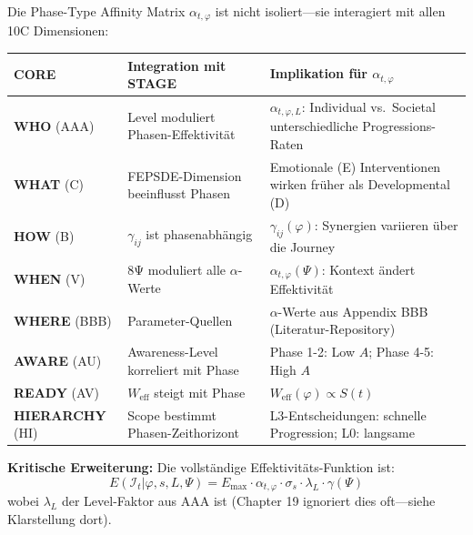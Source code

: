 \begin{tcolorbox}[colback=purple!5!white, colframe=purple!75!black,
    title=\textbf{10C Integration: STAGE (AW) und die anderen COREs}]

Die Phase-Type Affinity Matrix $\alpha_{t,\varphi}$ ist nicht isoliert---sie interagiert mit allen 10C Dimensionen:

\begin{center}
\renewcommand{\arraystretch}{1.2}
\footnotesize
\begin{tabular}{@{}llp{6cm}@{}}
\toprule
\textbf{CORE} & \textbf{Integration mit STAGE} & \textbf{Implikation für $\alpha_{t,\varphi}$} \\
\midrule
\textbf{WHO} (AAA) & Level moduliert Phasen-Effektivität & $\alpha_{t,\varphi,L}$: Individual vs.\ Societal unterschiedliche Progressions-Raten \\
\textbf{WHAT} (C) & FEPSDE-Dimension beeinflusst Phasen & Emotionale (E) Interventionen wirken früher als Developmental (D) \\
\textbf{HOW} (B) & $\gamma_{ij}$ ist phasenabhängig & $\gamma_{ij}(\varphi)$: Synergien variieren über die Journey \\
\textbf{WHEN} (V) & 8Ψ moduliert alle $\alpha$-Werte & $\alpha_{t,\varphi}(\Psi)$: Kontext ändert Effektivität \\
\textbf{WHERE} (BBB) & Parameter-Quellen & $\alpha$-Werte aus Appendix BBB (Literatur-Repository) \\
\textbf{AWARE} (AU) & Awareness-Level korreliert mit Phase & Phase 1-2: Low $A$; Phase 4-5: High $A$ \\
\textbf{READY} (AV) & $W_{\text{eff}}$ steigt mit Phase & $W_{\text{eff}}(\varphi) \propto S(t)$ \\
\textbf{HIERARCHY} (HI) & Scope bestimmt Phasen-Zeithorizont & L3-Entscheidungen: schnelle Progression; L0: langsame \\
\bottomrule
\end{tabular}
\end{center}

\textbf{Kritische Erweiterung:} Die vollständige Effektivitäts-Funktion ist:
\begin{equation}
\boxed{E(\mathcal{I}_t | \varphi, s, L, \Psi) = E_{\max} \cdot \alpha_{t,\varphi} \cdot \sigma_s \cdot \lambda_L \cdot \gamma(\Psi)}
\end{equation}
wobei $\lambda_L$ der Level-Faktor aus AAA ist (Chapter 19 ignoriert dies oft---siehe Klarstellung dort).

\end{tcolorbox}

